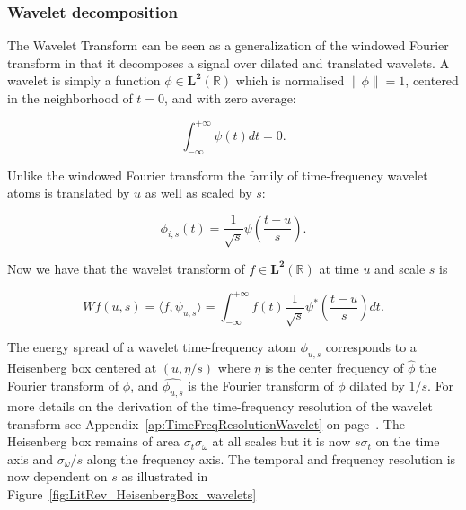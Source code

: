 \subsubsection{Wavelet decomposition}
The Wavelet Transform can be seen as a generalization of the windowed Fourier transform in that it decomposes a signal over dilated and translated wavelets. A wavelet is simply a function $\phi \in \mathbf{L^2}(\mathbb{R})$ which is normalised $\| \phi \| = 1$, centered in the neighborhood of $t=0$, and with zero average:

\begin{equation}\label{eq:Mallat1999_4}
\int^{+\infty}_{-\infty} \psi(t) dt = 0.
\end{equation}

Unlike the windowed Fourier transform the family of time-frequency wavelet atoms is translated by $u$ as well as scaled by $s$:

\begin{equation}\label{eq:Mallat1999_5}
\phi_{i,s}(t) = \frac{1}{\sqrt{s}}\psi\left(\frac{t-u}{s}\right).
\end{equation}

Now we have that the wavelet transform of $f \in \mathbf{L^2}(\mathbb{R})$ at time $u$ and scale $s$ is

\begin{equation}\label{eq:Mallat1999_x}
W f(u,s) = \langle f, \psi_{u,s} \rangle = \int^{+\infty}_{-\infty} f(t) \frac{1}{\sqrt{s}}\psi^\ast \left( \frac{t-u}{s} \right) dt.
\end{equation}

The energy spread of a wavelet time-frequency atom $\phi_{u,s}$ corresponds to a Heisenberg box centered at $(u,\eta/s)$ where $\eta$ is the center frequency of $\hat{\phi}$ the Fourier transform of $\phi$, and $\hat{\phi_{u,s}}$ is the Fourier transform of $\phi$ dilated by $1/s$. For more details on the derivation of the time-frequency resolution of the wavelet transform see Appendix~\ref{ap:TimeFreqResolutionWavelet} on page~\pageref{ap:TimeFreqResolutionWavelet}. The Heisenberg box remains of area $\sigma_t \sigma_\omega$ at all scales but it is now $s\sigma_t$ on the time axis and $\sigma_\omega /s$ along the frequency axis\cite{Mallat1999}. The temporal and frequency resolution is now dependent on $s$ as illustrated in Figure~\ref{fig:LitRev_HeisenbergBox_wavelets}

